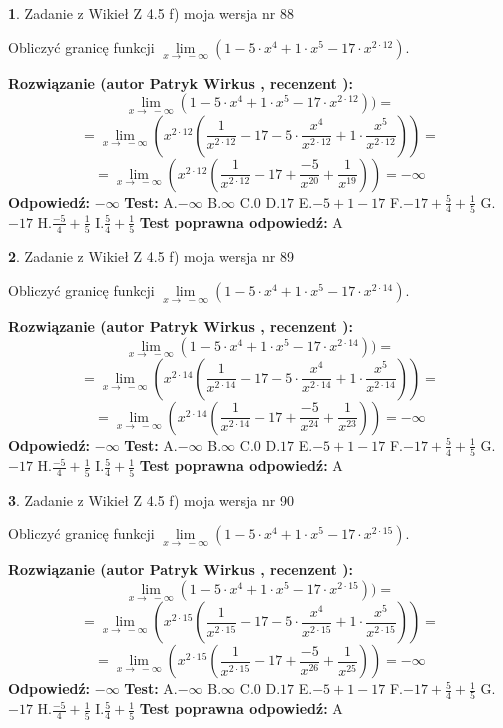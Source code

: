 \documentclass[12pt, a4paper]{article}
\theoremstyle{definition} %
\newtheorem{zad}{}
\newcommand{\zadStart}[1]{\begin{zad}#1\newline}
\newcommand{\zadStop}{\end{zad}}
\newcommand{\rozwStart}[2]{\noindent \textbf{Rozwiązanie (autor #1 , recenzent #2): }\newline}
\newcommand{\rozwStop}{\newline}
\newcommand{\odpStart}{\noindent \textbf{Odpowiedź:}\newline}
\newcommand{\odpStop}{\newline}
\newcommand{\testStart}{\noindent \textbf{Test:}\newline}
\newcommand{\testStop}{\newline}
\newcommand{\kluczStart}{\noindent \textbf{Test poprawna odpowiedź:}\newline}
\newcommand{\kluczStop}{\newline}
\begin{document}
\zadStart{Zadanie z Wikieł Z 4.5 f) moja wersja nr 88}



Obliczyć granicę funkcji  $\lim\limits_{x\to\ -\infty}(1 - 5 \cdot x^{4}+1 \cdot x^{5}- 17 \cdot x^{2\cdot12})$.
\zadStop
\rozwStart{Patryk Wirkus}{}
$$\lim\limits_{x\to\ -\infty}(1 - 5 \cdot x^{4}+1 \cdot x^{5}- 17 \cdot x^{2\cdot12}))=$$
$$=\lim\limits_{x\to\ -\infty}(x^{2\cdot12}(\frac{1}{x^{2\cdot12}}-17 -5 \cdot \frac{x^{4}}{x^{2\cdot12}}+1 \cdot \frac{x^{5}}{x^{2\cdot12}}))=$$
$$=\lim\limits_{x\to\ -\infty}(x^{2\cdot12}(\frac{1}{x^{2\cdot12}}-17 + \frac{-5}{x^{20}}+ \frac{1}{x^{19}}))=-\infty$$
\rozwStop
\odpStart
$-\infty$
\odpStop
\testStart
A.$-\infty$ B.$\infty$ C.$0$ D.$17$ E.$-5 + 1 - 17$
F.$-17+\frac{5}{4}+\frac{1}{5}$ G.$-17$
H.$\frac{-5}{4}+\frac{1}{5}$
I.$\frac{5}{4}+\frac{1}{5}$
\testStop
\kluczStart
A
\kluczStop



\zadStart{Zadanie z Wikieł Z 4.5 f) moja wersja nr 89}



Obliczyć granicę funkcji  $\lim\limits_{x\to\ -\infty}(1 - 5 \cdot x^{4}+1 \cdot x^{5}- 17 \cdot x^{2\cdot14})$.
\zadStop
\rozwStart{Patryk Wirkus}{}
$$\lim\limits_{x\to\ -\infty}(1 - 5 \cdot x^{4}+1 \cdot x^{5}- 17 \cdot x^{2\cdot14}))=$$
$$=\lim\limits_{x\to\ -\infty}(x^{2\cdot14}(\frac{1}{x^{2\cdot14}}-17 -5 \cdot \frac{x^{4}}{x^{2\cdot14}}+1 \cdot \frac{x^{5}}{x^{2\cdot14}}))=$$
$$=\lim\limits_{x\to\ -\infty}(x^{2\cdot14}(\frac{1}{x^{2\cdot14}}-17 + \frac{-5}{x^{24}}+ \frac{1}{x^{23}}))=-\infty$$
\rozwStop
\odpStart
$-\infty$
\odpStop
\testStart
A.$-\infty$ B.$\infty$ C.$0$ D.$17$ E.$-5 + 1 - 17$
F.$-17+\frac{5}{4}+\frac{1}{5}$ G.$-17$
H.$\frac{-5}{4}+\frac{1}{5}$
I.$\frac{5}{4}+\frac{1}{5}$
\testStop
\kluczStart
A
\kluczStop



\zadStart{Zadanie z Wikieł Z 4.5 f) moja wersja nr 90}



Obliczyć granicę funkcji  $\lim\limits_{x\to\ -\infty}(1 - 5 \cdot x^{4}+1 \cdot x^{5}- 17 \cdot x^{2\cdot15})$.
\zadStop
\rozwStart{Patryk Wirkus}{}
$$\lim\limits_{x\to\ -\infty}(1 - 5 \cdot x^{4}+1 \cdot x^{5}- 17 \cdot x^{2\cdot15}))=$$
$$=\lim\limits_{x\to\ -\infty}(x^{2\cdot15}(\frac{1}{x^{2\cdot15}}-17 -5 \cdot \frac{x^{4}}{x^{2\cdot15}}+1 \cdot \frac{x^{5}}{x^{2\cdot15}}))=$$
$$=\lim\limits_{x\to\ -\infty}(x^{2\cdot15}(\frac{1}{x^{2\cdot15}}-17 + \frac{-5}{x^{26}}+ \frac{1}{x^{25}}))=-\infty$$
\rozwStop
\odpStart
$-\infty$
\odpStop
\testStart
A.$-\infty$ B.$\infty$ C.$0$ D.$17$ E.$-5 + 1 - 17$
F.$-17+\frac{5}{4}+\frac{1}{5}$ G.$-17$
H.$\frac{-5}{4}+\frac{1}{5}$
I.$\frac{5}{4}+\frac{1}{5}$
\testStop
\kluczStart
A
\kluczStop
\end{document}
